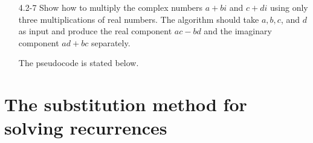 \begin{enumerate}
\begin{framed}
\end{framed}

\item[4.2{-}7]{Show how to multiply the complex numbers $a + b i$ and $c + di$
using only three multiplications of real numbers. The algorithm should take
$a, b, c$, and $d$ as input and produce the real component $ac - bd$ and the
imaginary component $ad + bc$ separately.}

\begin{framed}
The pseudocode is stated below.\\
\begin{algorithm}[H]
\SetAlgoNoEnd\DontPrintSemicolon
\BlankLine
{}
\end{algorithm}
\end{framed}

\end{enumerate}

\newpage

\section{The substitution method for solving recurrences}

